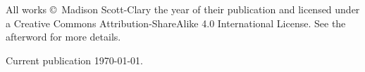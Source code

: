 \singlespacing
\thispagestyle{empty}
\null
\vfill
{\small
\noindent All works \copyright\ Madison Scott-Clary the year of their publication and licensed under a Creative Commons Attribution-ShareAlike 4.0 International License. See the afterword for more details.

\vspace{0.25in}

\noindent Current publication \today.
}
\vfill

\clearpage
